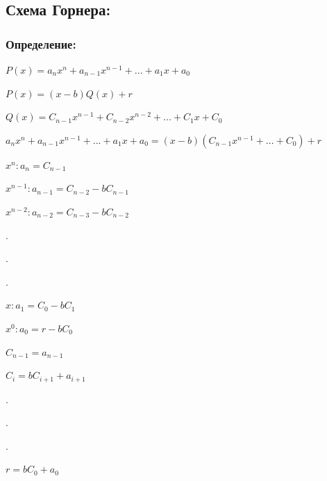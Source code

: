 \documentclass[12pt]{article}
\begin{document}
\subsection{Схема Горнера:}
\subsubsection{Определение:}
$P(x) = a_{n}x^{n} + a_{n-1}x^{n-1} + ... + a_{1}x + a_{0}$\par
$P(x)=(x-b)Q(x) + r$\par
$Q(x) = C_{n-1}x^{n-1} + C_{n-2}x^{n-2} + ... + C_{1}x + C_{0}$\par
$a_{n}x^{n} + a_{n-1}x^{n-1} + ... + a_{1}x + a_{0} = (x-b)(C_{n-1}x^{n-1} + ... + C_{0}) + r$\par
$x^{n}: a_{n} = C_{n-1}$\par
$x^{n-1}: a_{n-1} = C_{n-2} - bC_{n-1}$\par
$x^{n-2}: a_{n-2} = C_{n-3} - bC_{n-2}$\par
$.$\par
$.$\par
$.$\par
$x: a_{1} = C_{0} - bC_{1}$\par
$x^{0}: a_{0} = r - bC_{0}$\par
$C_{n-1} = a_{n-1}$\par
$C_{i} = bC_{i+1} + a_{i+1}$\par
$.$\par
$.$\par
$.$\par
$r = bC_{0} + a_{0}$\par
\end{document}
